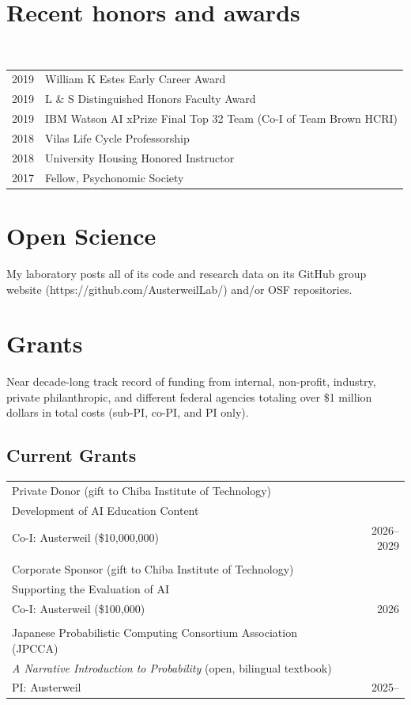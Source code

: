 \documentclass[a4paper,10pt]{article}
\begin{document}
\section{Recent honors and awards}

~\begin{tabular}{ll}
2019 & William K Estes Early Career Award\\
2019 & L \& S Distinguished Honors Faculty Award \\
2019 & IBM Watson AI xPrize Final Top 32 Team (Co-I of Team Brown HCRI) \\
2018 & Vilas Life Cycle Professorship\\
2018 & University Housing Honored Instructor\\
2017 & Fellow, Psychonomic Society\\
\end{tabular}

\section{Open Science}
My laboratory posts all of its code and research data on its GitHub group website (https://github.com/AusterweilLab/) and/or OSF repositories. 

\section{Grants}
Near decade-long track record of funding from internal, non-profit, industry, private philanthropic, and different federal agencies totaling over \$1 million dollars in total costs (sub-PI, co-PI, and PI only).

\subsection{Current Grants}
\begin{tabu}{Xr}

Private Donor (gift to Chiba Institute of Technology) & \\
Development of AI Education Content & \\
Co-I: Austerweil (\$10,000,000) & 2026--2029 \\ & \\

Corporate Sponsor (gift to Chiba Institute of Technology) & \\
Supporting the Evaluation of AI & \\
Co-I: Austerweil (\$100,000) & 2026 \\ & \\

Japanese Probabilistic Computing Consortium Association (JPCCA) & \\
\emph{A Narrative Introduction to Probability} (open, bilingual textbook) & \\
PI: Austerweil & 2025--
\end{tabu}
\end{document}
